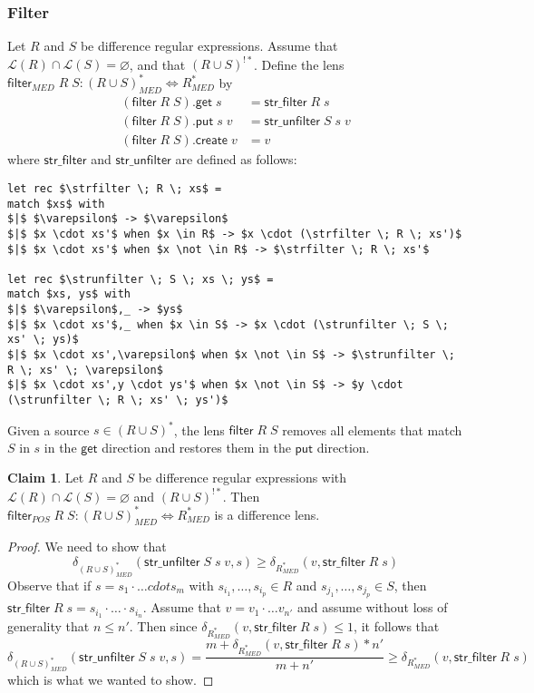 \documentclass[acmsmall,review,anonymous]{acmart}\settopmatter{printfolios=true,printccs=false,printacmref=false}
\theoremstyle{definition}
\newtheorem{claim}{Claim}
\newcommand{\kw}[1]{\ensuremath{\mathsf{#1}}\xspace}
\newcommand{\get}{\ensuremath{\kw{get}}\xspace}
\newcommand{\pput}{\ensuremath{\kw{put}}\xspace}
\newcommand{\create}{\ensuremath{\kw{create}}\xspace}
\newcommand{\filter}{\ensuremath{\kw{filter}}\xspace}
\newcommand{\strfilter}{\ensuremath{\kw{str\_filter}}\xspace}
\newcommand{\strunfilter}{\ensuremath{\kw{str\_unfilter}}\xspace}
\begin{document}
\subsubsection{Filter}
Let $R$ and $S$ be difference regular expressions. Assume that $\mathcal{L}(R) \cap \mathcal{L}(S) = \varnothing$, and that $(R \cup S)^{!*}$. Define the lens $\filter_{MED} \; R \; S : (R \cup S)^*_{MED} \Leftrightarrow R^*_{MED}$ by
\begin{align*}
(\filter \; R \; S).\get \; s &= \strfilter \; R \; s\\
(\filter \; R \; S).\pput \; s \; v &= \strunfilter \; S \; s \;v\\
(\filter \; R \; S).\create \; v &= v
\end{align*}
where \strfilter and \strunfilter are defined as follows:
\begin{lstlisting}[mathescape=true]
let rec $\strfilter \; R \; xs$ = 
match $xs$ with
$|$ $\varepsilon$ -> $\varepsilon$
$|$ $x \cdot xs'$ when $x \in R$ -> $x \cdot (\strfilter \; R \; xs')$
$|$ $x \cdot xs'$ when $x \not \in R$ -> $\strfilter \; R \; xs'$

let rec $\strunfilter \; S \; xs \; ys$ = 
match $xs, ys$ with
$|$ $\varepsilon$,_ -> $ys$
$|$ $x \cdot xs'$,_ when $x \in S$ -> $x \cdot (\strunfilter \; S \; xs' \; ys)$
$|$ $x \cdot xs',\varepsilon$ when $x \not \in S$ -> $\strunfilter \; R \; xs' \; \varepsilon$
$|$ $x \cdot xs',y \cdot ys'$ when $x \not \in S$ -> $y \cdot (\strunfilter \; R \; xs' \; ys')$
\end{lstlisting}
Given a source $s \in (R \cup S)^*$, the lens $\filter \; R \; S$ removes all elements that match $S$ in $s$ in the \get direction and restores them in the \pput direction.
\begin{claim}
Let $R$ and $S$ be difference regular expressions with $\mathcal{L}(R) \cap \mathcal{L}(S) = \varnothing$ and $(R \cup S)^{!*}$. Then $\filter_{POS} \; R \; S : (R \cup S)^*_{MED} \Leftrightarrow R^*_{MED}$ is a difference lens.
\end{claim}
\begin{proof}
We need to show that
$$
\delta_{(R \cup S)^*_{MED}} (\strunfilter \; S \; s \; v, s) \geq \delta_{R^*_{MED}}(v, \strfilter \; R \; s)$$
Observe that if $s = s_1 \cdot \ldots cdot s_m$ with $s_{i_1}, \ldots, s_{i_p} \in R$ and $s_{j_1}, \ldots, s_{j_p} \in S$, then $\strfilter \; R \; s = s_{i_1} \cdot \ldots \cdot s_{i_n}$. Assume that $v = v_1 \cdot \ldots v_{n'}$ and assume without loss of generality that $n \leq n'$. Then since $\delta_{R^*_{MED}}(v, \strfilter \; R \; s) \leq 1$, it follows that
$$
\delta_{(R \cup S)^*_{MED}} (\strunfilter \; S \; s \; v, s) = \frac{m + \delta_{R^*_{MED}}(v, \strfilter \; R \; s) * n'}{m+n'} \geq \delta_{R^*_{MED}}(v, \strfilter \; R \; s)
$$
which is what we wanted to show.
\end{proof}
\end{document}
